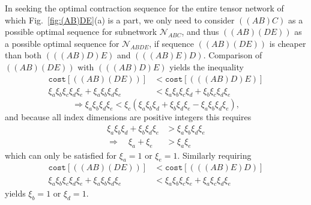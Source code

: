 \documentclass[aps,pre,reprint,superscriptaddress,amsfonts,amsmath,showpacs,nofootinbib,floatfix]{revtex4-1}
\newcommand{\mc}[1]{\mathcal{#1}}
\newcommand{\fref}[1]{Fig.~\ref{#1}}
\newcommand{\ttt}[1]{\texttt{#1}}
\newcommand{\xa}{\xi_a}
\newcommand{\xb}{\xi_b}
\newcommand{\xc}{\xi_c}
\newcommand{\xd}{\xi_d}
\newcommand{\xe}{\xi_e}
\begin{document}
In seeking the optimal contraction sequence for the entire tensor network of which \fref{fig:(AB)DE}(a) is a part, we only need to consider $((AB)C)$ as a possible optimal sequence %
for subnetwork $\mc{N}_{ABC}$, and thus $((AB)(DE))$ as a possible optimal sequence for $\mc{N}_{ABDE}$, if sequence $((AB)(DE))$ is cheaper than both $(((AB)D)E)$ and $(((AB)E)D)$. %
Comparison of $((AB)(DE))$ with $(((AB)D)E)$ yields the inequality 
\begin{equation}
\begin{split}
\ttt{cost}[((AB)(DE))]&<\ttt{cost}[(((AB)D)E)]\\
\xa\xb\xc\xd\xe+\xa\xb\xd\xe&<\xa\xb\xc\xd+\xb\xc\xd\xe
\end{split}\label{eq:ABDEineq1}
\end{equation}
\begin{equation}
\Rightarrow \xa\xb\xd\xe<\xc(\xa\xb\xd+\xb\xd\xe-\xa\xb\xd\xe),
\end{equation}
and because all index dimensions are positive integers this requires
\begin{equation}
\begin{split}
\xa\xb\xd+\xb\xd\xe&>\xa\xb\xd\xe\\
\Rightarrow\quad\xa+\xe&>\xa\xe
\end{split}
\end{equation}
which can only be satisfied for $\xa=1$ or $\xe=1$. Similarly requiring 
\begin{equation}
\begin{split}
\ttt{cost}[((AB)(DE))]&<\ttt{cost}[(((AB)E)D)] \\
\xa\xb\xc\xd\xe+\xa\xb\xd\xe&<\xa\xb\xc\xe+\xa\xc\xd\xe
\end{split}\label{eq:ABDEineq2} 
\end{equation}
yields $\xb=1$ or $\xd=1$.
\end{document}
